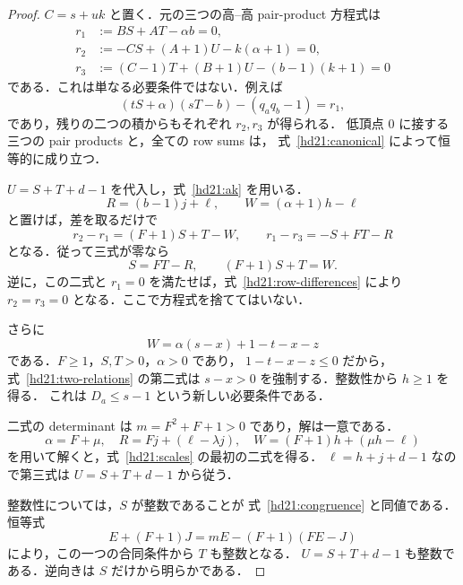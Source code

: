 \begin{proof}
$C=s+uk$ と置く．元の三つの高--高 pair-product 方程式は
\begin{equation}\label{hd21:original-linear}
\begin{split}
 r_1&:=BS+AT-\alpha b=0,\\
 r_2&:=-CS+(A+1)U-k(\alpha+1)=0,\\
 r_3&:=(C-1)T+(B+1)U-(b-1)(k+1)=0
\end{split}
\end{equation}
である．これは単なる必要条件ではない．例えば
\[
 (tS+\alpha)(sT-b)-(q_aq_b-1)=r_1,
\]
であり，残りの二つの積からもそれぞれ $r_2,r_3$ が得られる．
低頂点 $0$ に接する三つの pair products と，全ての row sums は，
式~\eqref{hd21:canonical} によって恒等的に成り立つ．

$U=S+T+d-1$ を代入し，式~\eqref{hd21:ak} を用いる．
\[
 R=(b-1)j+\ell,
 \qquad W=(\alpha+1)h-\ell
\]
と置けば，差を取るだけで
\begin{equation}\label{hd21:row-differences}
 r_2-r_1=(F+1)S+T-W,
 \qquad r_1-r_3=-S+FT-R
\end{equation}
となる．従って三式が零なら
\begin{equation}\label{hd21:two-relations}
 S=FT-R,\qquad (F+1)S+T=W.
\end{equation}
逆に，この二式と $r_1=0$ を満たせば，式~\eqref{hd21:row-differences} により
$r_2=r_3=0$ となる．ここで方程式を捨ててはいない．

さらに
\[
 W=\alpha(s-x)+1-t-x-z
\]
である．$F\ge1$，$S,T>0$，$\alpha>0$ であり，
$1-t-x-z\le0$ だから，式~\eqref{hd21:two-relations} の第二式は
$s-x>0$ を強制する．整数性から $h\ge1$ を得る．
これは $D_a\le s-1$ という新しい必要条件である．

二式の determinant は $m=F^2+F+1>0$ であり，解は一意である．
\[
 \alpha=F+\mu,\quad
 R=Fj+(\ell-\lambda j),\quad
 W=(F+1)h+(\mu h-\ell)
\]
を用いて解くと，式~\eqref{hd21:scales} の最初の二式を得る．
$\ell=h+j+d-1$ なので第三式は $U=S+T+d-1$ から従う．

整数性については，$S$ が整数であることが
式~\eqref{hd21:congruence} と同値である．恒等式
\begin{equation}\label{hd21:one-divisibility}
 E+(F+1)J=mE-(F+1)(FE-J)
\end{equation}
により，この一つの合同条件から $T$ も整数となる．
$U=S+T+d-1$ も整数である．逆向きは $S$ だけから明らかである．


\end{proof}
